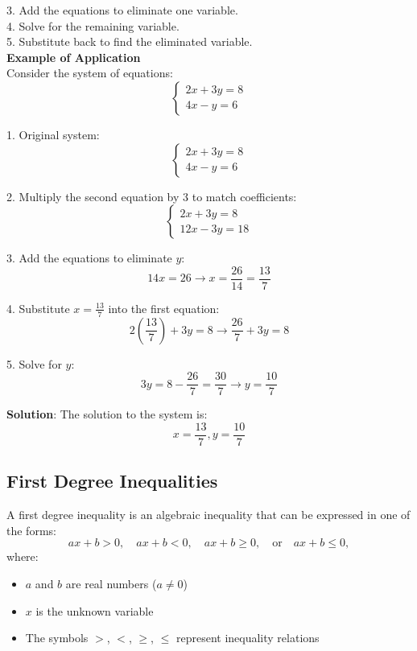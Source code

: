 \documentclass{article} %
\begin{document}
3. Add the equations to eliminate one variable.\\

4. Solve for the remaining variable.\\

5. Substitute back to find the eliminated variable.\\

\textbf{Example of Application}\\

Consider the system of equations:
\[
\begin{cases} 
2x + 3y = 8 \\ 
4x - y = 6 
\end{cases}
\]

1. Original system:
\[
\begin{cases} 
2x + 3y = 8 \\ 
4x - y = 6 
\end{cases}
\]

2. Multiply the second equation by 3 to match coefficients:
\[
\begin{cases} 
2x + 3y = 8 \\ 
12x - 3y = 18 
\end{cases}
\]

3. Add the equations to eliminate $y$:\\
\[
14x = 26 \rightarrow x = \frac{26}{14} = \frac{13}{7}
\]

4. Substitute $x = \frac{13}{7}$ into the first equation:\\
\[
2(\frac{13}{7}) + 3y = 8 \rightarrow \frac{26}{7} + 3y = 8
\]

5. Solve for $y$:\\
\[
3y = 8 - \frac{26}{7} = \frac{30}{7} \rightarrow y = \frac{10}{7}
\]

\textbf{Solution}: The solution to the system is:
\[
x = \frac{13}{7}, y = \frac{10}{7}
\]
\subsection{First Degree Inequalities}
A first degree inequality is an algebraic inequality that can be expressed in one of the forms:
\[
ax + b > 0, \quad ax + b < 0, \quad ax + b \geq 0, \quad \text{or} \quad ax + b \leq 0,
\]
where:
\begin{itemize}
    \item $a$ and $b$ are real numbers ($a \neq 0$)
    \item $x$ is the unknown variable
    \item The symbols $>$, $<$, $\geq$, $\leq$ represent inequality relations
\end{itemize}
\end{document}
